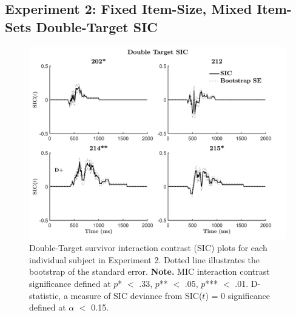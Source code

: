 \subsection{Experiment 2: Fixed Item-Size, Mixed Item-Sets Double-Target SIC}
\begin{figure}[htb]
\begin{center}
\includegraphics[width=\linewidth]{Figures/Appendix/FIG24PNG.png}
\caption{Double-Target survivor interaction contrast (SIC) plots for each individual subject in Experiment 2. Dotted line illustrates the bootstrap of the standard error.\newline
\textbf{Note.} MIC interaction contrast significance defined at $p$* $<$ .33, $p$** $<$ .05, $p$*** $<$ .01. D-statistic, a measure of SIC deviance from SIC($t$) = 0 significance defined at $\alpha$ $<$ 0.15.}
\label{fig:Indiv_SIC_AB_Ex2}
\end{center}
\end{figure}
\newpage

